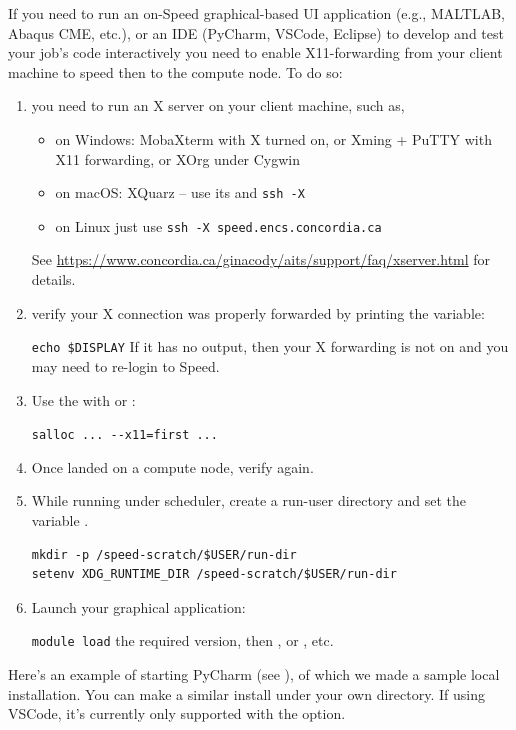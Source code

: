 If you need to run an on-Speed graphical-based UI application (e.g., MALTLAB,
Abaqus CME, etc.), or an IDE (PyCharm, VSCode, Eclipse)
to develop and test your job's code interactively you need to enable
X11-forwarding from your client machine to speed then to the compute node.
To do so:

\begin{enumerate}
\item
you need to run an X server on your client machine, such as,
\begin{itemize}
\item on Windows: MobaXterm with X turned on, or Xming + PuTTY with X11 forwarding, or XOrg under Cygwin
\item on macOS: XQuarz -- use its  and \texttt{ssh -X}
\item on Linux just use \texttt{ssh -X speed.encs.concordia.ca} 
\end{itemize}

See \url{https://www.concordia.ca/ginacody/aits/support/faq/xserver.html}
for details.

\item
verify your X connection was properly forwarded by printing the  variable:

\verb+echo $DISPLAY+
If it has no output, then your X forwarding is not on and you may need to re-login to Speed.

\item
Use the  with  or :

\verb+salloc ... --x11=first ...+

\item
Once landed on a compute node, verify  again.

\item
While running under scheduler, create a run-user directory and set the variable .
\begin{verbatim}
mkdir -p /speed-scratch/$USER/run-dir
setenv XDG_RUNTIME_DIR /speed-scratch/$USER/run-dir
\end{verbatim}

\item
Launch your graphical application:

\texttt{module load} the required version, then
, or , etc.
\end{enumerate}

Here's an example of starting PyCharm (see ), of which we made a sample local installation.
You can make a similar install under your own directory. If using VSCode, it's
currently only supported with the  option. \newline

